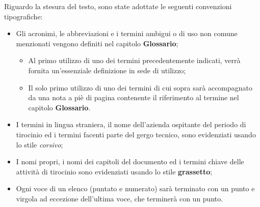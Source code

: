 Riguardo la stesura del testo, sono state adottate le seguenti convenzioni tipografiche:
\begin{itemize}
	\item Gli acronimi, le abbreviazioni e i termini ambigui o di uso non comune menzionati vengono definiti nel capitolo \textbf{Glossario}; 
        \begin{itemize}
            \item Al primo utilizzo di uno dei termini precedentemente indicati, verrà fornita un'essenziale definizione in sede di utilizzo;
            \item Il solo primo utilizzo di uno dei termini di cui sopra sarà accompagnato da una nota a piè di pagina contenente il riferimento al termine nel capitolo \textbf{Glossario}.
        \end{itemize} 
	\item I termini in lingua straniera, il nome dell'azienda ospitante del periodo di tirocinio ed i termini facenti parte del gergo tecnico, sono evidenziati usando lo stile \textit{corsivo};
	\item I nomi propri, i nomi dei capitoli del documento ed i termini chiave delle attività di tirocinio sono evidenziati usando lo stile \textbf{grassetto};
	\item Ogni voce di un elenco (puntato e numerato) sarà terminato con un punto e virgola ad eccezione dell'ultima voce, che terminerà con un punto.
\end{itemize}



\endgroup

\vfill

